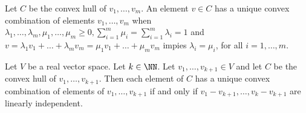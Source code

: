 \documentclass[12pt,a4paper]{article}
\begin{document}
\begin{definition}\label{def:uniqueconvexcombination}
	Let $C$ be the convex hull of $v_1,\ldots,v_m$. An element $v\in C$ has a unique convex combination of elements $v_1,\ldots,v_m$ when $\lambda_1,\ldots,\lambda_m,\mu_1,\ldots,\mu_m\ge 0,\sum_{i=1}^m\mu_i=\sum_{i=1}^m\lambda_i=1$ and $v=\lambda_1v_1+\ldots+\lambda_mv_m=\mu_1v_1+\ldots+\mu_mv_m$ impies $\lambda_i=\mu_i$, for all $i=1,\ldots,m$. 
\end{definition}


\begin{lemma}\label{lem:uniqueconvexcombinationintermsofindependentvectors}
	Let $V$ be a real vector space. Let $k\in\NN$. Let $v_1,\ldots,v_{k+1}\in V$ and let $C$ be the convex hull of $v_1,\ldots,v_{k+1}$. 
	Then each element of $C$ has a unique convex combination of elements of $v_1,\ldots,v_{k+1}$ if and only if  $v_1-v_{k+1},\ldots,v_{k}-v_{k+1}$ are linearly independent.
\end{lemma}
\end{document}
